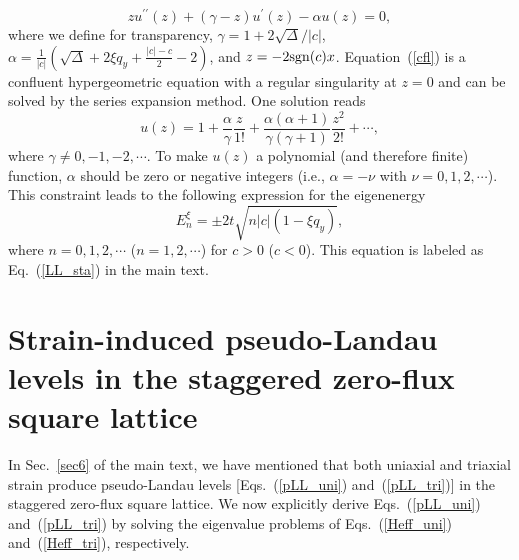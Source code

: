 \documentclass[aps, twocolumn, floatfix, superscriptaddress, prb]{revtex4-1}
\begin{document}
%
\begin{equation}\label{cfl}
zu^{\prime \prime } \left(z\right)+\left(\gamma -z\right)u^{\prime } \left(z\right)-\alpha u\left(z\right)=0,
\end{equation}
%
where we define for transparency, {$\gamma=1+2\sqrt\Delta/|c|$, $\alpha=\frac1{|c|}(\sqrt\Delta+2\xi q_y+\frac{|c|-c}{2}-2)$, and $z=-2{\rm sgn}(c)x$.} Equation~(\ref{cfl}) is a confluent hypergeometric equation with a regular singularity at $z = 0$ and can be solved by the series expansion method. One solution reads
%
\begin{equation}
u(z)=1+\frac{\alpha}{\gamma}\frac{z}{1!}+\frac{\alpha(\alpha+1)}{\gamma(\gamma+1)}\frac {z^2}{2!}+\cdots,
\end{equation}
%
where $\gamma\neq0,-1,-2,\cdots$. To make $u(z)$ a polynomial (and therefore finite) function, $\alpha$ should be zero or negative integers ({i.e., $\alpha=-\nu$ with $\nu=0,1,2,\cdots$}). This constraint leads to the following expression for the eigenenergy
%
\begin{equation}
E_n^\xi=\pm2t\sqrt{n|c|(1-\xi q_y)},
\end{equation}
%
where $n=0,1,2,\cdots$ ($n=1,2,\cdots$) for $c>0$ ($c<0$). This equation is labeled as Eq.~(\ref{LL_sta}) in the main text.




\section{{Strain-induced pseudo-Landau levels in the staggered zero-flux square lattice}}
\label{a3}
In Sec.~\ref{sec6} of the main text, we have mentioned that both uniaxial and triaxial strain produce pseudo-Landau levels [Eqs.~(\ref{pLL_uni}) and~(\ref{pLL_tri})] in the staggered zero-flux square lattice. We now explicitly derive Eqs.~(\ref{pLL_uni}) and~(\ref{pLL_tri}) by solving the eigenvalue problems of Eqs.~(\ref{Heff_uni}) and~(\ref{Heff_tri}), respectively.
\end{document}
